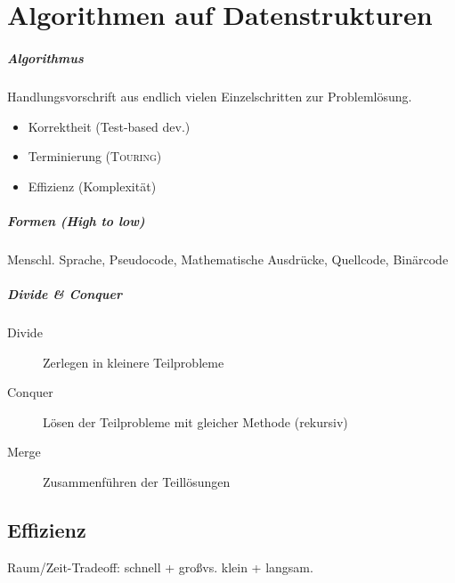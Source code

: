 \chapter{Algorithmen auf Datenstrukturen}

\paragraph{Algorithmus} Handlungsvorschrift aus endlich vielen Einzelschritten zur Problemlösung.

\begin{itemize}
  \item Korrektheit (Test-based dev.)
  \item Terminierung (\textsc{Touring})
  \item Effizienz (Komplexität)
\end{itemize}

\paragraph{Formen (High to low)}
Menschl. Sprache, Pseudocode, Mathematische Ausdrücke, Quellcode, Binärcode

\paragraph{Divide \& Conquer}

\begin{description}
  \item [Divide] Zerlegen in kleinere Teilprobleme
  \item [Conquer] Lösen der Teilprobleme mit gleicher Methode (rekursiv)
  \item [Merge] Zusammenführen der Teillösungen
\end{description}

\section{Effizienz}

Raum/Zeit-Tradeoff: schnell + gro\ss vs. klein + langsam.



